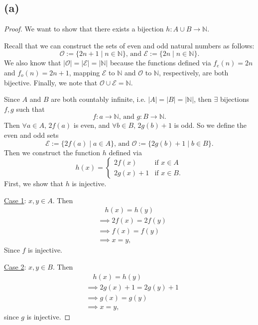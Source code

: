 \documentclass{article}
\begin{document}
\subsection*{(a)}
\begin{proof}
	We want to show that there exists a bijection $h: A\cup B\rightarrow \mathbb{N}$. 
	
	Recall that we can construct the sets of even and odd natural numbers as follows:
	\begin{equation}
		\mathcal{O} := \{2n+1 \;|\; n\in \mathbb{N}\} \textrm{, and } \mathcal{E}:=\{2n \;|\; n\in\mathbb{N}\}.
	\end{equation}
	We also know that $|\mathcal{O}| = |\mathcal{E}| = |\mathbb{N}|$ because the functions defined via $f_e(n)=2n$ and $f_o(n)=2n+1$, mapping $\mathcal{E}$ to $\mathbb{N}$ and $\mathcal{O}$ to $\mathbb{N}$, respectively, are both bijective. Finally, we note that $\mathcal{O}\cup\mathcal{E} = \mathbb{N}$.
	
	Since $A$ and $B$ are both countably infinite, i.e. $|A|=|B|=|\mathbb{N}|$, then $\exists$ bijections $f,g$ such that 
	\begin{equation}
		f: a\rightarrow \mathbb{N} \textrm{, and } g:B\rightarrow\mathbb{N}.
	\end{equation}
	Then $\forall a \in A$, $2f(a)$ is even, and $\forall b \in B$, $2g(b)+1$ is odd. So we define the even and odd sets
	\begin{equation}
		\mathcal{E} := \{2f(a) \;|\; a \in A\} \textrm{, and } \mathcal{O} := \{2g(b)+1 \;|\; b \in B\}.
	\end{equation}
	Then we construct the function $h$ defined via
	\begin{equation}
		h(x)=
		\begin{cases}
			2f(x) & \text{if } x \in A\\
			2g(x)+1 & \text{if } x \in B.
		\end{cases}
	\end{equation}
	First, we show that $h$ is injective.
	
	\underline{Case 1}: $x,y\in A$. Then 
	\begin{align}
		&\quad h(x) = h(y) \\
		&\implies 2f(x) = 2f(y) \\
		&\implies f(x) = f(y) \\
		&\implies x = y,
	\end{align}
	Since $f$ is injective.
	
	\underline{Case 2}: $x,y\in B$. Then
	\begin{align}
		&\quad h(x) = h(y) \\
		&\implies 2g(x) + 1 = 2g(y) + 1 \\
		&\implies g(x) = g(y) \\
		&\implies x = y,
	\end{align}
	since $g$ is injective. 
	

\end{proof}
\end{document}
